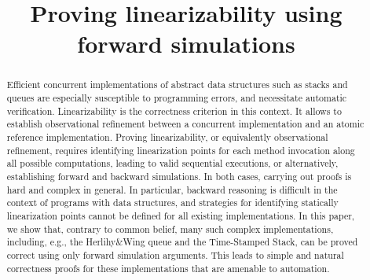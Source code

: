 \documentclass[orivec]{llncs}
\title{Proving linearizability using forward simulations}
\author{ }
\institute{ }
\begin{document}

\maketitle

\vspace{-10mm}
\begin{abstract}
Efficient concurrent implementations of abstract data structures such as stacks and queues are especially susceptible to programming errors, and necessitate automatic verification.
Linearizability is the correctness criterion in this context. It allows to establish observational refinement between a concurrent implementation and an atomic reference implementation.
Proving linearizability, or equivalently observational refinement, requires identifying linearization points for each method invocation along all possible computations, leading to valid sequential executions, or alternatively, establishing forward and backward simulations. In both cases, carrying out proofs is hard and complex in general. In particular, backward reasoning is difficult in the context of programs with data structures, and strategies for identifying statically linearization points cannot be defined for all existing implementations.  In this paper, we show that, contrary to common belief, many such complex implementations, including, e.g., the Herlihy\&Wing queue and the Time-Stamped Stack, can be proved correct using only forward simulation arguments. This leads to simple and natural correctness proofs for these implementations that are amenable to automation. 

\vspace{-2mm}
\end{abstract}







%






\newpage
\appendix






\end{document}
